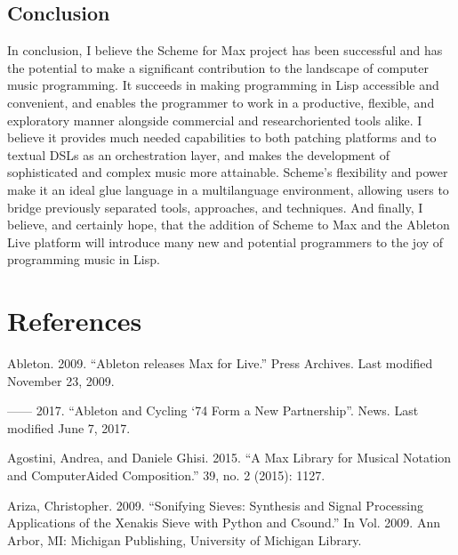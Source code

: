 \documentclass[letterpaper,10pt,english]{sphinxmanual}
\begin{document}
\section{Conclusion}
\label{\detokenize{conclusion:id1}}
\sphinxAtStartPar
In conclusion, I believe the Scheme for Max project has been successful and has the potential
to make a significant contribution to the landscape of computer music programming.
It succeeds in making programming in Lisp accessible and convenient, and enables
the programmer to work in a productive, flexible, and exploratory manner alongside
commercial and research\sphinxhyphen{}oriented tools alike.
I believe it provides much needed capabilities
to both patching platforms and to textual DSLs as an orchestration layer, and makes
the development of sophisticated and complex music more attainable.
Scheme’s flexibility and power make it an ideal glue language
in a multi\sphinxhyphen{}language environment, allowing users to bridge previously separated
tools, approaches, and techniques.
And finally, I believe, and certainly hope, that the addition of Scheme to Max and
the Ableton Live platform will introduce many new and potential programmers to the
joy of programming music in Lisp.

\sphinxstepscope


\chapter{References}
\label{\detokenize{bibliography:references}}\label{\detokenize{bibliography::doc}}
\sphinxAtStartPar
Ableton. 2009. “Ableton releases Max for Live.” Press Archives. Last modified November 23, 2009. 

\sphinxAtStartPar
—— 2017. “Ableton and Cycling ‘74 Form a New Partnership”. News. Last modified June 7, 2017. 

\sphinxAtStartPar
Agostini, Andrea, and Daniele Ghisi. 2015. “A Max Library for Musical Notation and Computer\sphinxhyphen{}Aided Composition.”  39, no. 2 (2015): 11\textendash{}27.

\sphinxAtStartPar
Ariza, Christopher. 2009. “Sonifying Sieves: Synthesis and Signal Processing Applications of the Xenakis Sieve with Python and Csound.” In  Vol. 2009. Ann Arbor, MI: Michigan Publishing, University of Michigan Library.
\end{document}
